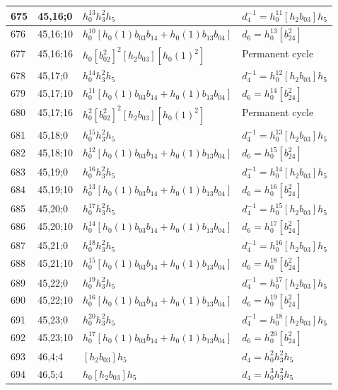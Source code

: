 \documentclass{article}
\begin{document}
\begin{longtable}{|l|l|>{\raggedright\arraybackslash}p{6cm}|>{\raggedright\arraybackslash}p{6cm}|}
\hline
675 & 45,16;0 & $h_0^{13}h_3^2h_5$ & $d_{4}^{-1}=h_0^{11}[h_2b_{03}]h_5$\\
\hline
676 & 45,16;10 & $h_0^{10}[h_0(1)b_{03}b_{14} + h_0(1)b_{13}b_{04}]$ &$d_{6}=h_0^{13}[b_{24}^2]$\\
\hline
677 & 45,16;16 & $h_0[b_{02}^2]^2[h_2b_{03}][h_0(1)^2]$ & Permanent cycle\\
\hline
678 & 45,17;0 & $h_0^{14}h_3^2h_5$ & $d_{4}^{-1}=h_0^{12}[h_2b_{03}]h_5$\\
\hline
679 & 45,17;10 & $h_0^{11}[h_0(1)b_{03}b_{14} + h_0(1)b_{13}b_{04}]$ &$d_{6}=h_0^{14}[b_{24}^2]$\\
\hline
680 & 45,17;16 & $h_0^2[b_{02}^2]^2[h_2b_{03}][h_0(1)^2]$ & Permanent cycle\\
\hline
681 & 45,18;0 & $h_0^{15}h_3^2h_5$ & $d_{4}^{-1}=h_0^{13}[h_2b_{03}]h_5$\\
\hline
682 & 45,18;10 & $h_0^{12}[h_0(1)b_{03}b_{14} + h_0(1)b_{13}b_{04}]$ &$d_{6}=h_0^{15}[b_{24}^2]$\\
\hline
683 & 45,19;0 & $h_0^{16}h_3^2h_5$ & $d_{4}^{-1}=h_0^{14}[h_2b_{03}]h_5$\\
\hline
684 & 45,19;10 & $h_0^{13}[h_0(1)b_{03}b_{14} + h_0(1)b_{13}b_{04}]$ &$d_{6}=h_0^{16}[b_{24}^2]$\\
\hline
685 & 45,20;0 & $h_0^{17}h_3^2h_5$ & $d_{4}^{-1}=h_0^{15}[h_2b_{03}]h_5$\\
\hline
686 & 45,20;10 & $h_0^{14}[h_0(1)b_{03}b_{14} + h_0(1)b_{13}b_{04}]$ &$d_{6}=h_0^{17}[b_{24}^2]$\\
\hline
687 & 45,21;0 & $h_0^{18}h_3^2h_5$ & $d_{4}^{-1}=h_0^{16}[h_2b_{03}]h_5$\\
\hline
688 & 45,21;10 & $h_0^{15}[h_0(1)b_{03}b_{14} + h_0(1)b_{13}b_{04}]$ &$d_{6}=h_0^{18}[b_{24}^2]$\\
\hline
689 & 45,22;0 & $h_0^{19}h_3^2h_5$ & $d_{4}^{-1}=h_0^{17}[h_2b_{03}]h_5$\\
\hline
690 & 45,22;10 & $h_0^{16}[h_0(1)b_{03}b_{14} + h_0(1)b_{13}b_{04}]$ &$d_{6}=h_0^{19}[b_{24}^2]$\\
\hline
691 & 45,23;0 & $h_0^{20}h_3^2h_5$ & $d_{4}^{-1}=h_0^{18}[h_2b_{03}]h_5$\\
\hline
692 & 45,23;10 & $h_0^{17}[h_0(1)b_{03}b_{14} + h_0(1)b_{13}b_{04}]$ &$d_{6}=h_0^{20}[b_{24}^2]$\\
\hline
693 & 46,4;4 & $[h_2b_{03}]h_5$ &$d_{4}=h_0^2h_3^2h_5$\\
\hline
694 & 46,5;4 & $h_0[h_2b_{03}]h_5$ &$d_{4}=h_0^3h_3^2h_5$\\

\end{longtable}
\end{document}
